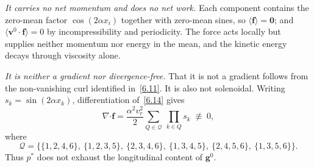 \documentclass[11pt]{jfm}
\providecommand\bcdot{\boldsymbol{\cdot}}
\numberwithin{equation}{section}
\begin{document}
\emph{It carries no net momentum and does no net work.} Each component contains the zero-mean
factor $\cos(2\alpha x_i)$ together with zero-mean sines, so $\langle\boldsymbol{f}\rangle=
\boldsymbol{0}$; and
$\langle\boldsymbol{v}^0\!\cdot\!\boldsymbol{f}\rangle=0$ by incompressibility and periodicity.
The force acts locally but supplies neither momentum nor energy in the mean, and the kinetic energy
decays through viscosity alone.

\emph{It is neither a gradient nor divergence-free.} That it is not a gradient follows from the
non-vanishing curl identified in~\eqref{6.11}. It is also not solenoidal. Writing
$s_k=\sin(2\alpha x_k)$, differentiation of~\eqref{6.14} gives
\begin{equation}
\label{eq:divf6}
\nabla\bcdot\boldsymbol{f}
= \frac{\alpha^2 v_r^2}{2}\sum_{Q\in\mathcal{Q}}\ \prod_{k\in Q}s_k \;\not\equiv\;0,
\end{equation}
where
\[
\mathcal{Q}=\bigl\{\{1,2,4,6\},\ \{1,2,3,5\},\ \{2,3,4,6\},\ \{1,3,4,5\},\ \{2,4,5,6\},\
\{1,3,5,6\}\bigr\}.
\]
Thus $p^{*}$ does not exhaust the longitudinal content of $\boldsymbol{g}^0$.
\end{document}
